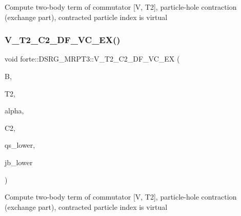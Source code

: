 Compute two-\/body term of commutator \mbox{[}V, T2\mbox{]}, particle-\/hole contraction (exchange part), contracted particle index is virtual \mbox{\label{classforte_1_1_d_s_r_g___m_r_p_t3_ab486aac4ea25510f0ca1d94b39d3e12d}} 
\subsubsection{\texorpdfstring{V\+\_\+\+T2\+\_\+\+C2\+\_\+\+D\+F\+\_\+\+V\+C\+\_\+\+E\+X()}{V\_T2\_C2\_DF\_VC\_EX()}}
{\footnotesize\ttfamily void forte\+::\+D\+S\+R\+G\+\_\+\+M\+R\+P\+T3\+::\+V\+\_\+\+T2\+\_\+\+C2\+\_\+\+D\+F\+\_\+\+V\+C\+\_\+\+EX (\begin{DoxyParamCaption}\item[{Blocked\+Tensor \&}]{B,  }\item[{Blocked\+Tensor \&}]{T2,  }\item[{const double \&}]{alpha,  }\item[{Blocked\+Tensor \&}]{C2,  }\item[{const std\+::vector$<$ std\+::string $>$ \&}]{qs\+\_\+lower,  }\item[{const std\+::vector$<$ std\+::string $>$ \&}]{jb\+\_\+lower }\end{DoxyParamCaption})\hspace{0.3cm}{\ttfamily [protected]}}

Compute two-\/body term of commutator \mbox{[}V, T2\mbox{]}, particle-\/hole contraction (exchange part), contracted particle index is virtual \mbox{\label{classforte_1_1_d_s_r_g___m_r_p_t3_a0e00b4f4fdac4498d4d16c3f8cda54de}} 
